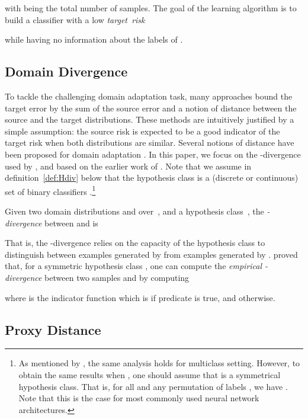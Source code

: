 \documentclass[twoside,11pt]{article}
\begin{document}
with  being the total number of samples. 
The goal of the learning algorithm is to build a classifier  with a low \emph{target~risk}

while having no information about the labels of .


\subsection{Domain Divergence}

To tackle the challenging domain adaptation task, many  approaches bound the target error by the sum of the source error and a notion of distance between the source and the target distributions. These methods are intuitively justified by a simple assumption: the source risk is expected to be a good indicator of the target risk when both distributions are similar. Several notions of distance have been proposed for domain adaptation \citep{BenDavid-NIPS06,BenDavid-MLJ2010,Mansour-COLT09,MansourMR09,pbda}.
In this paper, we focus on the -divergence used by \citet{BenDavid-NIPS06,BenDavid-MLJ2010}, and based on the earlier work of \citet{kifer-2004}. Note that we assume in definition~\ref{def:Hdiv} below that the hypothesis class  is a (discrete or continuous) set of binary classifiers .\footnote{As mentioned by \citet{BenDavid-NIPS06}, the same analysis holds for multiclass setting. However, to obtain the same results when , one should assume that  is a symmetrical hypothesis class. That is, for all  and any permutation of labels , we have . Note that this is the case for most commonly used neural network architectures.}
\begin{definition} \label{def:Hdiv}
Given two domain distributions  and  over~, and a hypothesis class~, the \emph{-divergence} between  and  is

\end{definition}

That is, the -divergence relies on the capacity of the hypothesis class  to distinguish between examples generated by  from examples generated by .
\citet{BenDavid-NIPS06,BenDavid-MLJ2010} proved that, for a symmetric hypothesis class , one can compute the \emph{empirical -divergence} between two samples  and   by computing

where  is the indicator function which is  if predicate  is true, and  otherwise.

\subsection{Proxy Distance}
\label{section:PAD}
\end{document}
